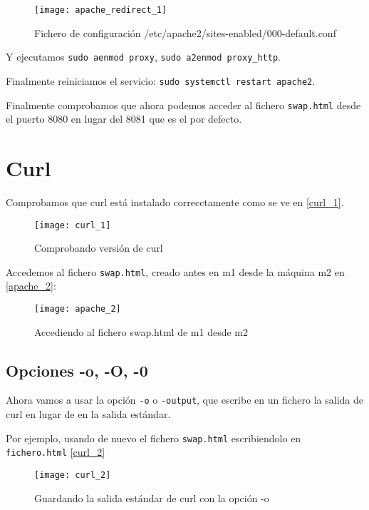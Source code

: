 \begin{figure}[h!]
\begin{center}
\caption{Fichero de configuración /etc/apache2/sites-enabled/000-default.conf}
\label{apache_redireccion}
\texttt{[image: apache\_redirect\_1]}
\end{center}
\end{figure}

Y ejecutamos \verb|sudo aenmod proxy|, \verb|sudo a2enmod proxy_http|.

Finalmente reiniciamos el servicio: \verb|sudo systemctl restart apache2|.

Finalmente comprobamos que ahora podemos acceder al fichero \verb|swap.html| desde el puerto 8080 en lugar del 8081 que es el por defecto.

\chapter{Curl}

Comprobamos que curl está instalado correcctamente como se ve en \eqref{curl_1}.

\begin{figure}[h!]
\begin{center}
\caption{Comprobando versión de curl}
\label{curl_1}
\texttt{[image: curl\_1]}
\end{center}
\end{figure}

Accedemos al fichero \verb|swap.html|, creado antes en m1 desde la máquina m2 en \eqref{apache_2}:

\begin{figure}[h!]
\begin{center}
\caption{Accediendo al fichero swap.html de m1 desde m2 }
\label{curl_2}
\texttt{[image: apache\_2]}
\end{center}
\end{figure}

\section{Opciones -o, -O, -0}

Ahora vamos a usar la opción \verb|-o| o \verb|-output|, que escribe en un fichero la salida de curl en lugar de en la salida estándar.

Por ejemplo, usando de nuevo el fichero \verb|swap.html| escribiendolo en \verb|fichero.html| \eqref{curl_2}

\begin{figure}[h!]
\begin{center}
\caption{Guardando la salida estándar de curl con la opción -o }
\label{curl_2}
\texttt{[image: curl\_2]}
\end{center}
\end{figure}

